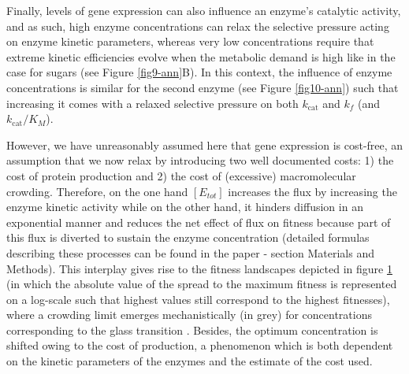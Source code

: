 \begin{figure}[h!]
\label{fig11-ann}
\end{figure}

Finally, levels of gene expression can also influence an enzyme's catalytic activity, and as such, high enzyme concentrations can relax the selective pressure acting on enzyme kinetic parameters, whereas very low concentrations require that extreme kinetic efficiencies evolve when the metabolic demand is high like in the case for sugars (see Figure \ref{fig9-ann}B). In this context, the influence of enzyme concentrations is similar for the second enzyme (see Figure \ref{fig10-ann}) such that increasing it comes with a relaxed selective pressure on both $k_\text{cat}$ and $k_f$ (and $k_\text{cat}/K_M$). %

However, we have unreasonably assumed here that gene expression is cost-free, an assumption that we now relax by introducing two well documented costs: 1) the cost of protein production and 2) the cost of (excessive) macromolecular crowding. Therefore, on the one hand $[E_{tot}]$ increases the flux by increasing the enzyme kinetic activity while on the other hand, it hinders diffusion in an exponential manner and reduces the net effect of flux on fitness because part of this flux is diverted to sustain the enzyme concentration (detailed formulas describing these processes can be found in the paper - section Materials and Methods). This interplay gives rise to the fitness landscapes depicted in figure \ref{fig11-ann} (in which the absolute value of the spread to the maximum fitness is represented on a log-scale such that highest values still correspond to the highest fitnesses), where a crowding limit emerges mechanistically (in grey) for concentrations corresponding to the glass transition \citep{Dill11}. Besides, the optimum concentration is shifted owing to the cost of production, a phenomenon which is both dependent on the kinetic parameters of the enzymes and the estimate of the cost used. %

